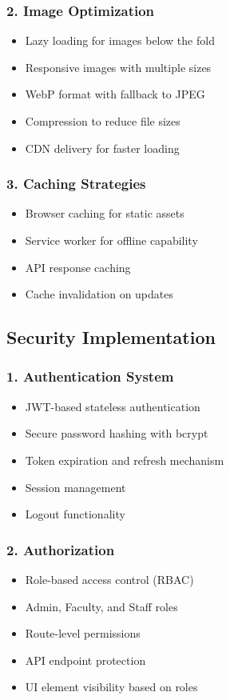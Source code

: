 \documentclass[12pt,a4paper]{report}
\begin{document}
\subsubsection*{2. Image Optimization}
\begin{itemize}
    \item Lazy loading for images below the fold
    \item Responsive images with multiple sizes
    \item WebP format with fallback to JPEG
    \item Compression to reduce file sizes
    \item CDN delivery for faster loading
\end{itemize}

\subsubsection*{3. Caching Strategies}
\begin{itemize}
    \item Browser caching for static assets
    \item Service worker for offline capability
    \item API response caching
    \item Cache invalidation on updates
\end{itemize}

\subsection{Security Implementation}

\subsubsection*{1. Authentication System}
\begin{itemize}
    \item JWT-based stateless authentication
    \item Secure password hashing with bcrypt
    \item Token expiration and refresh mechanism
    \item Session management
    \item Logout functionality
\end{itemize}

\subsubsection*{2. Authorization}
\begin{itemize}
    \item Role-based access control (RBAC)
    \item Admin, Faculty, and Staff roles
    \item Route-level permissions
    \item API endpoint protection
    \item UI element visibility based on roles
\end{itemize}
\end{document}
